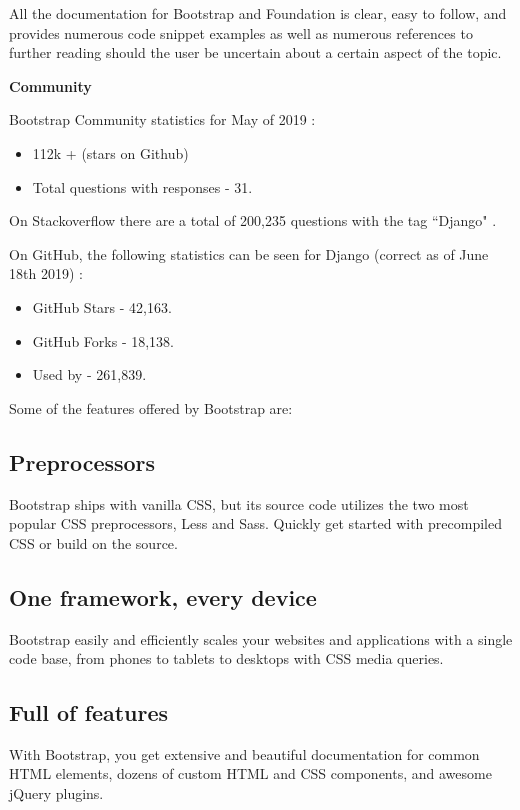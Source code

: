\documentclass{article}
\begin{document}
All the documentation for Bootstrap and Foundation is clear, easy to follow, and provides numerous code snippet examples as well as numerous references to further reading should the user be uncertain about a certain aspect of the topic. 


\textbf{Community}

Bootstrap Community statistics for May of 2019 \cite{djangocommunity}:

\begin{itemize}
    \item 112k + (stars on Github)
    \item Total questions with responses - 31.
\end{itemize}


On Stackoverflow there are a total of 200,235 questions with the tag ``Django" \cite{stackdjango}.

On GitHub, the following statistics can be seen for Django (correct as of June 18th 2019) \cite{githubdjango}:

\begin{itemize}
    \item GitHub Stars - 42,163.
    \item GitHub Forks - 18,138.
    \item Used by - 261,839.
\end{itemize}

Some of the features offered by Bootstrap are:

\subsection{Preprocessors}Bootstrap ships with vanilla CSS, but its source code utilizes the two most popular CSS preprocessors, Less and Sass. Quickly get started with precompiled CSS or build on the source.
\subsection{One framework, every device}Bootstrap easily and efficiently scales your websites and applications with a single code base, from phones to tablets to desktops with CSS media queries.
\subsection{Full of features}With Bootstrap, you get extensive and beautiful documentation for common HTML elements, dozens of custom HTML and CSS components, and awesome jQuery plugins.
\end{document}
